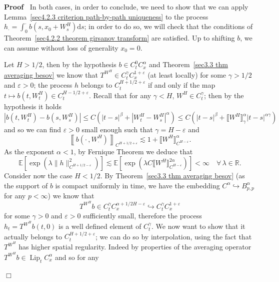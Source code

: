 \documentclass[10pt]{article}
\newcommand{\mathd}{\mathrm{d}}
\newcommand{\tmop}[1]{\ensuremath{\operatorname{#1}}}
\newenvironment{proof}{\noindent\textbf{Proof\ }}{\hspace*{\fill}$\Box$\medskip}
\begin{document}
\begin{proof}
  In both cases, in order to conclude, we need to show that we can apply
  Lemma~\ref{sec4.2.3 criterion path-by-path uniqueness} to the process
  $h_{\cdot} = \int_0^{\cdot} b (s, x_0 + W^H_s) \mathd s$; in order to do so,
  we will check that the conditions of Theorem~\ref{sec4.2.2 theorem girsanov
  transform} are satisfied. Up to shifting $b$, we can assume without loss of
  generality $x_0 = 0$.
  
  Let $H > 1 / 2$, then by the hypothesis $b \in C^0_t C^{\alpha}_x$ and
  Theorem~\ref{sec3.3 thm averaging besov} we know that $T^{W^H} \in
  C^{\gamma}_t C^{1 + \varepsilon}_x$ (at least locally) for some $\gamma > 1
  / 2$ and $\varepsilon > 0$; the process $h$ belongs to $C_t^{H + 1 / 2 +
  \varepsilon}$ if and only if the map $t \mapsto b (t, W^H_t) \in C_t^{H - 1
  / 2 + \varepsilon}$. Recall that for any $\gamma < H$, $W^H \in
  C_t^{\gamma}$; then by the hypothesis it holds
  \[ | b (t, W^H_t) - b (s, W^H_s) | \leqslant C (| t - s |^{\beta} + | W^H_t
     - W^H_s |^{\alpha}) \leqslant C (| t - s |^{\beta} + \llbracket W^H
     \rrbracket^{\alpha}_{\gamma} | t - s |^{\alpha \gamma}) \]
  and so we can find $\varepsilon > 0$ small enough such that $\gamma = H -
  \varepsilon$ and
  \[ \left\llbracket b \left( \cdot \,, W^H_{\cdot} \right)
     \right\rrbracket_{C^{H + 1 / 2 + \varepsilon}} \lesssim 1 + \llbracket
     W^H \rrbracket^{\alpha}_{C^{H - \varepsilon}} . \]
  As the exponent $\alpha < 1$, by Fernique Theorem we deduce that
  \[ \mathbb{E} [\exp (\lambda \| h \|_{C^{H + 1 / 2 - \varepsilon}}^2)]
     \lesssim \mathbb{E} [\exp (\lambda C \llbracket W^H \rrbracket_{C^{H -
     \varepsilon}}^{2 \alpha})] < \infty \quad \forall \, \lambda \in
     \mathbb{R}. \]
  Consider now the case $H < 1 / 2$. By Theorem~\ref{sec3.3 thm averaging
  besov} (as the support of $b$ is compact uniformly in time, we have the
  embedding $C^{\alpha} \hookrightarrow B^{\alpha}_{p, p}$ for any $p <
  \infty$) we know that
  \[ T^{W^H} b \in C^{\gamma}_t C^{\alpha + 1 / 2 H - \varepsilon}_x
     \hookrightarrow C^{\gamma}_t C^{1 + \varepsilon}_x \]
  for some $\gamma > 0$ and $\varepsilon > 0$ sufficiently small, therefore
  the process $h_t = T^{W^H} b (t, 0)$ is a well defined element of
  $C^{\gamma}_t$. We now want to show that it actually belongs to $C_t^{H + 1
  / 2 + \varepsilon}$; \quad we can do so by interpolation, using the fact
  that $T^{W^H}$ has higher spatial regularity. Indeed by properties of the
  averaging operator $T^{W^H} b \in \tmop{Lip}_t C^{\alpha}_x$ and so for any

\end{proof}
\end{document}
